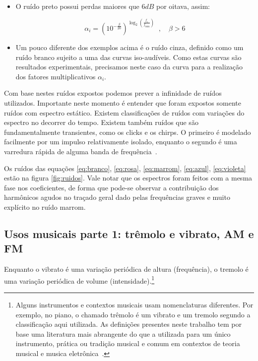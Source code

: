 \begin{itemize}
\item O ruído preto possui perdas maiores que $6dB$ por oitava, assim:

\begin{equation}\label{eq:preto}
\alpha_i=(10^{-\frac{\beta}{20}})^{\log _2 \left( \frac{f_i}{f_{\text{min}}} \right )}\;\;, \quad \beta > 6
\end{equation}



\item Um pouco diferente dos exemplos acima é o ruído cinza, definido como
um ruído branco sujeito a uma das curvas iso-audíveis. Como estas curvas são resultados
experimentais, precisamos neste caso da curva para a realização dos fatores multiplicativos
$\alpha_i$.

\end{itemize}

Com base nestes ruídos expostos podemos prever a infinidade de ruídos utilizados. Importante
neste momento é entender que foram expostos somente ruídos com espectro estático. Existem classificações
de ruídos com variações do espectro no decorrer do tempo. Existem também ruídos que
são fundamentalmente transientes, como os clicks e os chirps. O primeiro é modelado
facilmente por um impulso relativamente isolado, enquanto o segundo é uma varredura rápida de 
alguma banda de frequência~\cite{Cook}.

Os ruídos das equações \ref{eq:branco}, \ref{eq:rosa}, \ref{eq:marrom},
\ref{eq:azul}, \ref{eq:violeta} estão na figura \ref{fig:ruidos}. Vale notar
que os espectros foram feitos com a mesma fase nos coeficientes, de forma que
pode-se observar a contribuição dos harmônicos agudos no traçado geral dado
pelas frequências graves e muito explícito no ruído marrom.


\subsection{Usos musicais parte 1: trêmolo e vibrato, AM e FM}

Enquanto o vibrato é uma variação periódica de altura (frequência),
o tremolo é uma variação periódica de volume (intensidade).\footnote{Alguns instrumentos e contextos musicais usam nomenclaturas diferentes. Por exemplo, no piano, o chamado trêmolo é um vibrato e um tremolo segundo a classificação aqui utilizada. As definições presentes neste trabalho tem por base uma literatura mais abrangente do que a utilizada para um único instrumento, prática ou tradição musical e comum em contextos de teoria musical e musica eletrônica~\cite{Lacerda,Harmonia}.}

